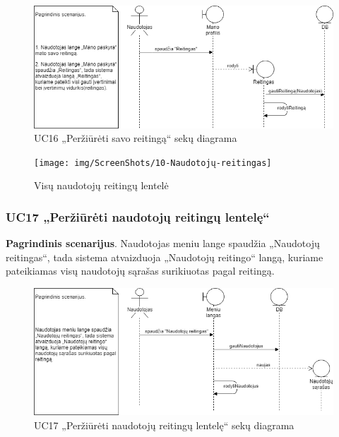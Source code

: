 \documentclass{VUMIFPSbakalaurinis}
\begin{document}
\begin{figure}[H]
	\centering
	\includegraphics[scale=0.6]{img/Sequence/SD16}
	\caption{UC16 „Peržiūrėti savo reitingą“ sekų diagrama}
	\label{img:uc16seq}
\end{figure}

\begin{figure}[H]
	\centering
	\texttt{[image: img/ScreenShots/10-Naudotojų-reitingas]}
	\caption{Visų naudotojų reitingų lentelė}
	\label{img:rating table}
\end{figure}
\subsubsection{UC17 „Peržiūrėti naudotojų reitingų lentelę“}
\textbf{Pagrindinis scenarijus}. Naudotojas meniu lange spaudžia „Naudotojų reitingas“, tada sistema atvaizduoja „Naudotojų reitingo“ langą, kuriame pateikiamas visų naudotojų sąrašas surikiuotas pagal reitingą.

\begin{figure}[H]
	\centering
	\includegraphics[scale=0.6]{img/Sequence/SD17}
	\caption{UC17 „Peržiūrėti naudotojų reitingų lentelę“ sekų diagrama}
	\label{img:uc17seq}
\end{figure}
\end{document}
